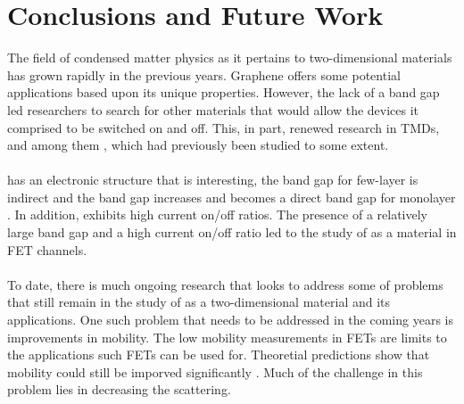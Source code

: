 \documentclass[%
 reprint,
 amsmath,amssymb,
 aps,
pra,
floatfix,
]{revtex4-1}
\begin{document}
\section{\label{sec:problems_and_outlook} Conclusions and Future Work}
The field of condensed matter physics as it pertains to two-dimensional materials has grown rapidly in the previous years. Graphene offers some potential applications based upon its unique properties. However, the lack of a band gap led researchers to search for other materials that would allow the devices it comprised to be switched on and off. This, in part, renewed research in TMDs, and among them , which had previously been studied to some extent. \\ \\
 has an electronic structure that is interesting, the band gap for few-layer  is indirect and the band gap increases and becomes a direct band gap for monolayer . In addition,  exhibits high current on/off ratios. The presence of a relatively large band gap and a high current on/off ratio led to the study of  as a material in FET channels. \\ \\
To date, there is much ongoing research that looks to address some of problems that still remain in the study of  as a two-dimensional material and its applications. One such problem that needs to be addressed in the coming years is improvements in mobility. The low mobility measurements in  FETs are limits to the applications such FETs can be used for. Theoretial predictions show that mobility could still be imporved significantly \cite{Kaasbjerg2013}. Much of the challenge in this problem lies in decreasing the scattering. 



\end{document}

